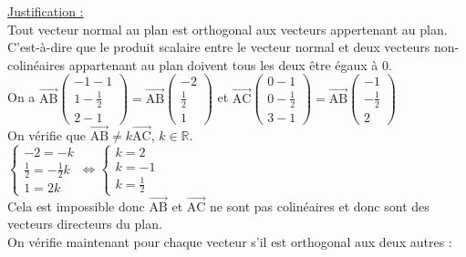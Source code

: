 \documentclass[a4paper, 12pt]{article}
\begin{document}
\noindent
\underline{Justification :}
\\
Tout vecteur normal au plan est orthogonal aux vecteurs appertenant au plan. 
C'est-à-dire que le produit scalaire entre le vecteur normal et deux vecteurs non-colinéaires appartenant au plan doivent tous les deux être égaux à 0.
\\
On a $\overrightarrow{\text{AB}}\begin{pmatrix}-1-1\\1-\frac{1}{2} \\ 2-1\end{pmatrix} = \overrightarrow{\text{AB}}\begin{pmatrix} -2 \\ \frac{1}{2} \\ 1\end{pmatrix}$ et 
$\overrightarrow{\text{AC}}\begin{pmatrix} 0-1 \\ 0- \frac{1}{2} \\ 3-1 \end{pmatrix} = \overrightarrow{\text{AB}}\begin{pmatrix} -1 \\ -\frac{1}{2} \\ 2 \end{pmatrix}$
\\[2mm]
On vérifie que $\overrightarrow{\text{AB}} \neq k\overrightarrow{\text{AC}}$, $k \in \mathbb{R}$.
\\[2mm]
$\begin{cases} -2 = -k \\ \frac{1}{2} = -\frac{1}{2}k \\ 1 = 2k \end{cases} \iff \begin{cases}k = 2 \\ k = -1 \\ k = \frac{1}{2} \end{cases}$ 
\\[2mm]
Cela est impossible donc $\overrightarrow{\text{AB}}$ et $\overrightarrow{\text{AC}}$ ne sont pas colinéaires et donc sont des vecteurs directeurs du plan. 
\\
On vérifie maintenant pour chaque vecteur s'il est orthogonal aux deux autres :
\vspace{3mm}
\end{document}
